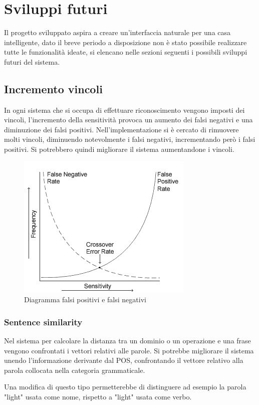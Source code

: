 \documentclass[twoside]{supsistudent}
\begin{document}
\chapter{Sviluppi futuri}
Il progetto sviluppato aspira a creare un'interfaccia naturale per una casa intelligente, dato il breve periodo a disposizione non è stato possibile realizzare tutte le funzionalità ideate, si elencano nelle sezioni seguenti i possibili sviluppi futuri del sistema.
\section{Incremento vincoli}
In ogni sistema che si occupa di effettuare riconoscimento vengono imposti dei vincoli, l'incremento della sensitività provoca un aumento dei falsi negativi e una diminuzione dei falsi positivi.
Nell'implementazione si è cercato di rimuovere molti vincoli, diminuendo notevolmente i falsi negativi, incrementando però i falsi positivi.
Si potrebbero quindi migliorare il sistema aumentandone i vincoli.
\begin{figure}[H]
\centering
\includegraphics[scale=0.8]{falseRate}
\caption{Diagramma falsi positivi e falsi negativi}
\label{fig:pose}
\end{figure}
\subsection{Sentence similarity}
Nel sistema per calcolare la distanza tra un dominio o un operazione e una frase vengono confrontati i vettori relativi alle parole. Si potrebbe migliorare il sistema unendo l'informazione derivante dal POS, confrontando il vettore relativo alla parola collocata nella categoria grammaticale.

Una modifica di questo tipo permetterebbe di distinguere ad esempio la parola "light" usata come nome, rispetto a "light" usata come verbo.
\end{document}
